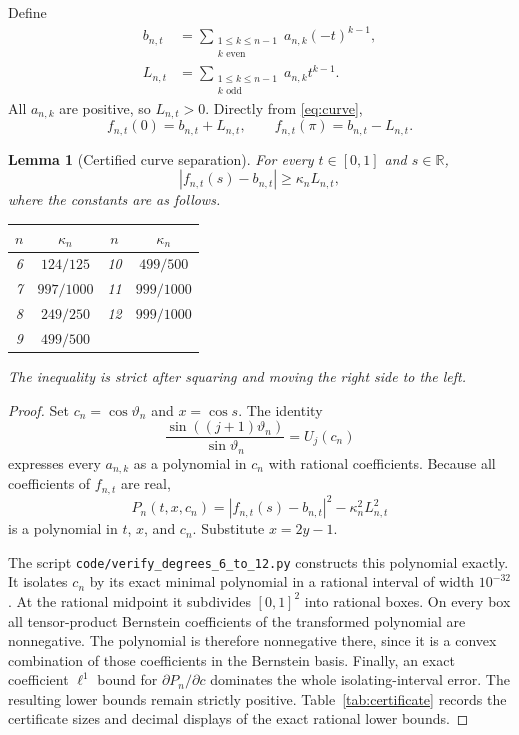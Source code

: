 \documentclass[11pt]{article}
\newtheorem{lemma}[theorem]{Lemma}
\begin{document}
Define
\begin{align}
 b_{n,t}&=\sum_{\substack{1\leq k\leq n-1\\ k\text{ even}}}
             a_{n,k}(-t)^{k-1},\label{eq:centerA}\\
 L_{n,t}&=\sum_{\substack{1\leq k\leq n-1\\ k\text{ odd}}}
             a_{n,k}t^{k-1}.\label{eq:LA}
\end{align}
All $a_{n,k}$ are positive, so $L_{n,t}>0$.  Directly from
\eqref{eq:curve},
\[
 f_{n,t}(0)=b_{n,t}+L_{n,t},\qquad
 f_{n,t}(\pi)=b_{n,t}-L_{n,t}.
\]

\begin{lemma}[Certified curve separation]\label{lem:curve}
For every $t\in[0,1]$ and $s\in\mathbb R$,
\[
 |f_{n,t}(s)-b_{n,t}|\geq \kappa_nL_{n,t},
\]
where the constants are as follows.
\begin{center}
\begin{tabular}{c@{\qquad}c|c@{\qquad}c}
\toprule
$n$&$\kappa_n$&$n$&$\kappa_n$\\
\midrule
6&$124/125$&10&$499/500$\\
7&$997/1000$&11&$999/1000$\\
8&$249/250$&12&$999/1000$\\
9&$499/500$&&\\
\bottomrule
\end{tabular}
\end{center}
The inequality is strict after squaring and moving the right side to the
left.
\end{lemma}

\begin{proof}
Set $c_n=\cos\vartheta_n$ and $x=\cos s$.  The identity
\[
 \frac{\sin((j+1)\vartheta_n)}{\sin\vartheta_n}=U_j(c_n)
\]
expresses every $a_{n,k}$ as a polynomial in $c_n$ with rational
coefficients.  Because all coefficients of $f_{n,t}$ are real,
\[
 P_n(t,x,c_n)=|f_{n,t}(s)-b_{n,t}|^2-\kappa_n^2L_{n,t}^2
\]
is a polynomial in $t$, $x$, and $c_n$.  Substitute $x=2y-1$.

The script \texttt{code/verify\_degrees\_6\_to\_12.py} constructs this
polynomial exactly.  It isolates $c_n$ by its exact minimal polynomial in a
rational interval of width $10^{-32}$.  At the rational midpoint it
subdivides $[0,1]^2$ into rational boxes.  On every box all tensor-product
Bernstein coefficients of the transformed polynomial are nonnegative.
The polynomial is therefore nonnegative there, since it is a convex
combination of those coefficients in the Bernstein basis.  Finally, an
exact coefficient $\ell^1$ bound for $\partial P_n/\partial c$ dominates the
whole isolating-interval error.  The resulting lower bounds remain strictly
positive.  Table~\ref{tab:certificate} records the certificate sizes and
decimal displays of the exact rational lower bounds.
\end{proof}
\end{document}
